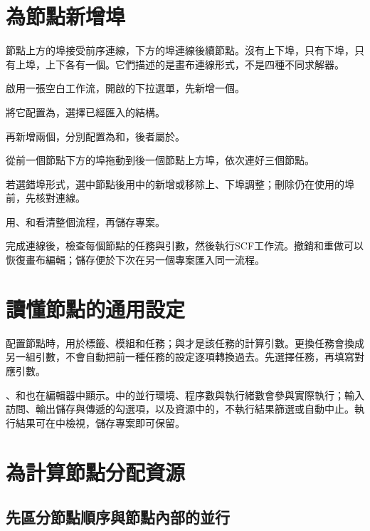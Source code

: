 \section{為節點新增埠}

節點上方的埠接受前序連線，下方的埠連線後續節點。沒有上下埠，只有下埠，只有上埠，上下各有一個。它們描述的是畫布連線形式，不是四種不同求解器。

\begin{steps}
\item 啟用一張空白工作流，開啟的下拉選單，先新增一個。
\item 將它配置為，選擇已經匯入的結構。
\item 再新增兩個，分別配置為和，後者屬於。
\item 從前一個節點下方的埠拖動到後一個節點上方埠，依次連好三個節點。
\item 若選錯埠形式，選中節點後用中的新增或移除上、下埠調整；刪除仍在使用的埠前，先核對連線。
\item 用、和看清整個流程，再儲存專案。
\end{steps}

完成連線後，檢查每個節點的任務與引數，然後執行SCF工作流。撤銷和重做可以恢復畫布編輯；儲存便於下次在另一個專案匯入同一流程。

\section{讀懂節點的通用設定}

配置節點時，用於標籤、模組和任務；與才是該任務的計算引數。更換任務會換成另一組引數，不會自動把前一種任務的設定逐項轉換過去。先選擇任務，再填寫對應引數。

、和也在編輯器中顯示。中的並行環境、程序數與執行緒數會參與實際執行；輸入訪問、輸出儲存與傳遞的勾選項，以及資源中的，不執行結果篩選或自動中止。執行結果可在中檢視，儲存專案即可保留。

\section{為計算節點分配資源}\label{sec:node-resources}

\subsection{先區分節點順序與節點內部的並行}

